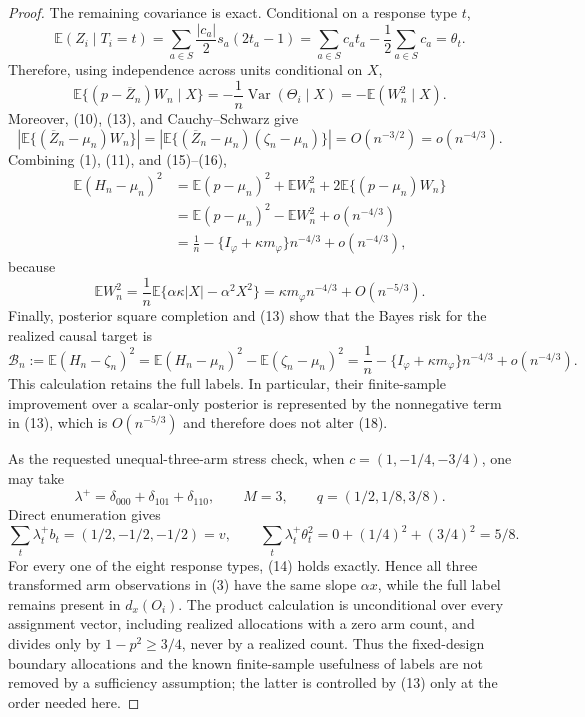 \documentclass{article}
\begin{document}
{\begin{proof}
The remaining covariance is exact.  Conditional on a response type \(t\),
\[
\mathbb E(Z_i\mid T_i=t)
=\sum_{a\in S}\frac{|c_a|}{2}s_a(2t_a-1)
=\sum_{a\in S}c_at_a-\frac12\sum_{a\in S}c_a
=\theta_t.
\tag{14}
\]
Therefore, using independence across units conditional on \(X\),
\[
\mathbb E\{(p-\overline Z_n)W_n\mid X\}
=-\frac1n\operatorname{Var}(\Theta_i\mid X)
=-\mathbb E(W_n^2\mid X).
\tag{15}
\]
Moreover, (10), (13), and Cauchy--Schwarz give
\[
\left|\mathbb E\{(\overline Z_n-\mu_n)W_n\}\right|
=\left|\mathbb E\{(\overline Z_n-\mu_n)(\zeta_n-\mu_n)\}\right|
=O(n^{-3/2})=o(n^{-4/3}).
\tag{16}
\]
Combining (1), (11), and (15)--(16),
\[
\begin{aligned}
\mathbb E(H_n-\mu_n)^2
&=\mathbb E(p-\mu_n)^2+\mathbb EW_n^2
+2\mathbb E\{(p-\mu_n)W_n\}\\
&=\mathbb E(p-\mu_n)^2-\mathbb EW_n^2+o(n^{-4/3})\\
&=\frac1n-\{I_\varphi+\kappa m_\varphi\}n^{-4/3}
+o(n^{-4/3}),
\end{aligned}
\tag{17}
\]
because
\[
\mathbb EW_n^2
=\frac1n\mathbb E\{\alpha\kappa|X|-\alpha^2X^2\}
=\kappa m_\varphi n^{-4/3}+O(n^{-5/3}).
\]
Finally, posterior square completion and (13) show that the Bayes risk for the realized causal target is
\[
\mathcal B_n
:=\mathbb E(H_n-\zeta_n)^2
=\mathbb E(H_n-\mu_n)^2-\mathbb E(\zeta_n-\mu_n)^2
=\frac1n-\{I_\varphi+\kappa m_\varphi\}n^{-4/3}
+o(n^{-4/3}).
\tag{18}
\]
This calculation retains the full labels.  In particular, their finite-sample improvement over a scalar-only posterior is represented by the nonnegative term in (13), which is \(O(n^{-5/3})\) and therefore does not alter (18).

As the requested unequal-three-arm stress check, when
\(c=(1,-1/4,-3/4)\), one may take
\[
\lambda^+=\delta_{000}+\delta_{101}+\delta_{110},
\qquad M=3,
\qquad q=(1/2,1/8,3/8).
\]
Direct enumeration gives
\[
\sum_t\lambda_t^+b_t=(1/2,-1/2,-1/2)=v,
\qquad
\sum_t\lambda_t^+\theta_t^2=0+(1/4)^2+(3/4)^2=5/8.
\]
For every one of the eight response types, (14) holds exactly.  Hence all three transformed arm observations in (3) have the same slope \(\alpha x\), while the full label remains present in \(d_x(O_i)\).  The product calculation is unconditional over every assignment vector, including realized allocations with a zero arm count, and divides only by \(1-p^2\ge3/4\), never by a realized count.  Thus the fixed-design boundary allocations and the known finite-sample usefulness of labels are not removed by a sufficiency assumption; the latter is controlled by (13) only at the order needed here.


\end{proof}}
\end{document}
